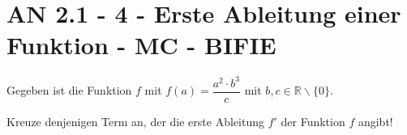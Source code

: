 \section{AN 2.1 - 4 - Erste Ableitung einer Funktion - MC - BIFIE}

\begin{beispiel}[AN 2.1]{1} %
				Gegeben ist die Funktion $f$ mit $f(a)=\dfrac{a^2\cdot b^3}{c}$ mit $b,c\in\mathbb{R}\backslash\{0\}$.

Kreuze denjenigen Term an, der die erste Ableitung $f'$ der Funktion $f$ angibt!

\end{beispiel}
